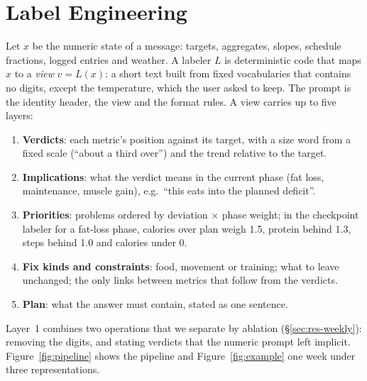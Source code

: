 \documentclass[10pt,twocolumn]{article}
\begin{document}
\section{Label Engineering}
\label{sec:method}

Let $x$ be the numeric state of a message: targets, aggregates, slopes, schedule fractions, logged entries and
weather. A labeler $L$ is deterministic code that maps $x$ to a \emph{view} $v=L(x)$: a short text built from fixed
vocabularies that contains no digits, except the temperature, which the user asked to keep. The prompt is the identity
header, the view and the format rules. A view carries up to five layers:
\begin{enumerate}
\item \textbf{Verdicts}: each metric's position against its target, with a size word from a fixed scale (``about a
third over'') and the trend relative to the target.
\item \textbf{Implications}: what the verdict means in the current phase (fat loss, maintenance, muscle gain), e.g.\
``this eats into the planned deficit''.
\item \textbf{Priorities}: problems ordered by deviation $\times$ phase weight; in the checkpoint labeler for a
fat-loss phase, calories over plan weigh 1.5, protein behind 1.3, steps behind 1.0 and calories under 0.
\item \textbf{Fix kinds and constraints}: food, movement or training; what to leave unchanged; the only links between
metrics that follow from the verdicts.
\item \textbf{Plan}: what the answer must contain, stated as one sentence.
\end{enumerate}
Layer~1 combines two operations that we separate by ablation (\S\ref{sec:res-weekly}): removing the digits, and
stating verdicts that the numeric prompt left implicit.
Figure~\ref{fig:pipeline} shows the pipeline and Figure~\ref{fig:example} one week under three representations.
\end{document}
